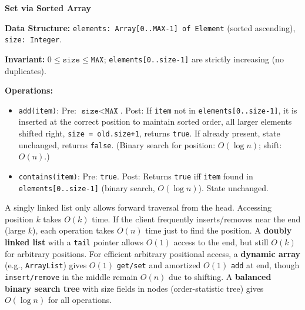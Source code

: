 \documentclass[11pt]{article}
\begin{document}
\begin{corrige}[Exercise 2]
\textbf{Set via Sorted Array}

\textbf{Data Structure:} \texttt{elements: Array[0..MAX-1] of Element} (sorted ascending), \texttt{size: Integer}.

\textbf{Invariant:} $0 \le \texttt{size} \le \texttt{MAX}$; \texttt{elements[0..size-1]} are strictly increasing (no duplicates).

\textbf{Operations:}
\begin{itemize}
    \item \texttt{add(item)}: Pre: $\texttt{size} < \texttt{MAX}$. Post: If \texttt{item} not in \texttt{elements[0..size-1]}, it is inserted at the correct position to maintain sorted order, all larger elements shifted right, \texttt{size = old.size+1}, returns \texttt{true}. If already present, state unchanged, returns \texttt{false}. (Binary search for position: $O(\log n)$; shift: $O(n)$.)
    \item \texttt{contains(item)}: Pre: \texttt{true}. Post: Returns \texttt{true} iff \texttt{item} found in \texttt{elements[0..size-1]} (binary search, $O(\log n)$). State unchanged.
\end{itemize}
\end{corrige}

\begin{corrige}[Exercise 3]
A singly linked list only allows forward traversal from the head. Accessing position $k$ takes $O(k)$ time. If the client frequently inserts/removes near the end (large $k$), each operation takes $O(n)$ time just to find the position. A \textbf{doubly linked list} with a \texttt{tail} pointer allows $O(1)$ access to the end, but still $O(k)$ for arbitrary positions. For efficient arbitrary positional access, a \textbf{dynamic array} (e.g., \texttt{ArrayList}) gives $O(1)$ \texttt{get/set} and amortized $O(1)$ \texttt{add} at end, though \texttt{insert/remove} in the middle remain $O(n)$ due to shifting. A \textbf{balanced binary search tree} with size fields in nodes (order-statistic tree) gives $O(\log n)$ for all operations.
\end{corrige}
\end{document}
